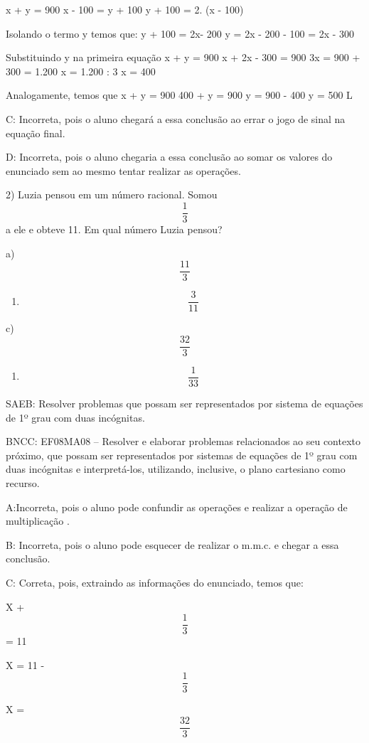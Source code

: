 x + y = 900 x - 100 = y + 100 y + 100 = 2. (x - 100)

Isolando o termo y temos que: y + 100 = 2x- 200 y = 2x - 200 - 100 = 2x
- 300

Substituindo y na primeira equação x + y = 900 x + 2x - 300 = 900 3x =
900 + 300 = 1.200 x = 1.200 : 3 x = 400

Analogamente, temos que x + y = 900 400 + y = 900 y = 900 - 400 y = 500
L

C: Incorreta, pois o aluno chegará a essa conclusão ao errar o jogo de
sinal na equação final.

D: Incorreta, pois o aluno chegaria a essa conclusão ao somar os valores
do enunciado sem ao mesmo tentar realizar as operações.

2) Luzia pensou em um número racional. Somou \[\frac{1}{3}\] a ele e
obteve 11. Em qual número Luzia pensou?

a) \[\frac{11}{3}\]

\begin{enumerate}
\def\labelenumi{\alph{enumi})}
\setcounter{enumi}{1}
\tightlist
\item
  \[\frac{3}{11}\]
\end{enumerate}

c) \[\frac{32}{3}\]

\begin{enumerate}
\def\labelenumi{\alph{enumi})}
\setcounter{enumi}{3}
\tightlist
\item
  \[\frac{1}{33}\]
\end{enumerate}

SAEB: Resolver problemas que possam ser representados por sistema de
equações de 1º grau com duas incógnitas.

BNCC: EF08MA08 -- Resolver e elaborar problemas relacionados ao seu
contexto próximo, que possam ser representados por sistemas de equações
de 1º grau com duas incógnitas e interpretá-los, utilizando, inclusive,
o plano cartesiano como recurso.

A:Incorreta, pois o aluno pode confundir as operações e realizar a
operação de multiplicação .

B: Incorreta, pois o aluno pode esquecer de realizar o m.m.c. e chegar a
essa conclusão.

C: Correta, pois, extraindo as informações do enunciado, temos que:

X + \[\frac{1}{3}\] = 11

X = 11 - \[\frac{1}{3}\]

X = \[\frac{32}{3}\]

